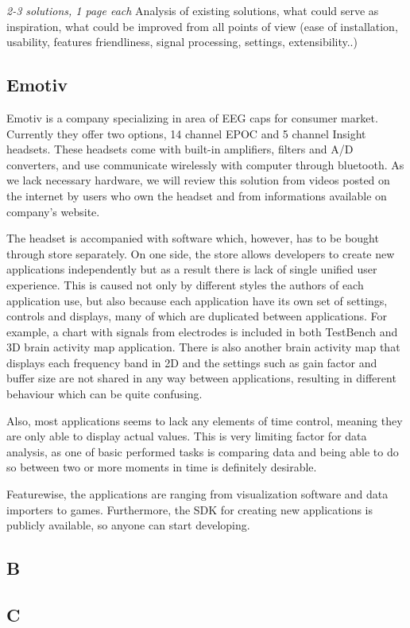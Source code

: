 \emph{2-3 solutions, 1 page each}
Analysis of existing solutions, what could serve as inspiration, what could be
improved from all points of view (ease of installation, usability, features
friendliness, signal processing, settings, extensibility..)
\subsection{Emotiv}
Emotiv is a company specializing in area of EEG caps for consumer market.
Currently they offer two options, 14 channel EPOC and 5 channel Insight
headsets. These headsets come with built-in amplifiers, filters and A/D
converters, and use communicate wirelessly with computer through bluetooth. As
we lack necessary hardware, we will review this solution from videos posted on
the internet by users who own the headset and from informations available on
company's website.

The headset is accompanied with software which, however, has to be bought
through store separately. On one side, the store allows developers to create new
applications independently but as a result there is lack of single unified user
experience. This is caused not only by different styles the authors of each
application use, but also because each application have its own set of settings,
controls and displays, many of which are duplicated between applications. For
example, a chart with signals from electrodes is included in both TestBench and
3D brain activity map application. There is also another brain activity map that
displays each frequency band in 2D and the settings such as gain factor and
buffer size are not shared in any way between applications, resulting in
different behaviour which can be quite confusing.

Also, most applications seems to lack any elements of time control, meaning
they are only able to display actual values. This is very limiting factor for
data analysis, as one of basic performed tasks is comparing data and being
able to do so between two or more moments in time is definitely desirable.

Featurewise, the applications are ranging from visualization software and
data importers to games. Furthermore, the SDK for creating new applications is
publicly available, so anyone can start developing.
\subsection{B}
\subsection{C}
